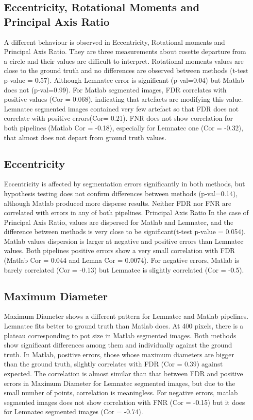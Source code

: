\documentclass{frontiersSCNS} %
\begin{document}
\subsection{Eccentricity, Rotational Moments and Principal Axis Ratio}
A different behaviour is observed in Eccentricity, Rotational moments and Principal Axis Ratio. They are three measurements about rosette departure from a circle and their values are difficult to interpret. Rotational moments values are close to the ground truth and no differences are observed between methods (t-test p-value = 0.57). Although Lemnatec error is significant (p-val=0.04) but Matlab does not (p-val=0.99). For Matlab segmented images, FDR correlates with positive values (Cor = 0.068), indicating that artefacts are modifying this value. Lemnatec segmented images contained very few artefact so that FDR does not correlate with positive errors(Cor=-0.21). FNR does not show correlation for both pipelines (Matlab Cor = -0.18), especially for Lemnatec one (Cor = -0.32), that almost does not depart from ground truth values.
\subsection{Eccentricity}
 Eccentricity is affected by segmentation errors significantly in both methods, but hypothesis testing does not confirm differences between methods (p-val=0.14), although Matlab produced more disperse results. Neither FDR nor FNR are correlated with errors in any of both pipelines.
Principal Axis Ratio
In the case of Principal Axis Ratio, values are dispersed for Matlab and Lemnatec, and the difference between methods is very close to be significant(t-test p-value = 0.054). Matlab values dispersion is larger at negative and positive errors than Lemnatec values. Both pipelines positive errors show a very small correlation with FDR (Matlab Cor = 0.044 and Lemna Cor = 0.0074). For negative errors, Matlab is barely correlated (Cor = -0.13) but Lemnatec is slightly correlated (Cor = -0.5).
\subsection{Maximum Diameter}
Maximum Diameter shows a different pattern for Lemnatec and Matlab pipelines. Lemnatec fits better to ground truth than Matlab does. At 400 pixels, there is a plateau corresponding to pot size in Matlab segmented images. Both methods show significant differences among them and individually against the ground truth. In Matlab, positive errors, those whose maximum diameters are bigger than the ground truth, slightly correlates with FDR (Cor = 0.39) against expected. The correlation is almost similar than that between FDR and positive errors in Maximum Diameter for Lemnatec segmented images, but due to the small number of points, correlation is meaningless. For negative errors, matlab segmented images does not show correlation with FNR (Cor = -0.15) but it does for Lemnatec segmented images (Cor = -0.74).
\end{document}
